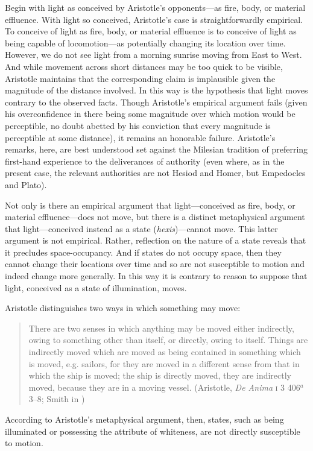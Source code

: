 Begin with light as conceived by Aristotle's opponents---as fire, body, or material effluence. With light so conceived, Aristotle's case is straightforwardly empirical. To conceive of light as fire, body, or material effluence is to conceive of light as being capable of locomotion---as potentially changing its location over time. However, we do not see light from a morning sunrise moving from East to West. And while movement across short distances may be too quick to be visible, Aristotle maintains that the corresponding claim is implausible given the magnitude of the distance involved. In this way is the hypothesis that light moves contrary to the observed facts. Though Aristotle's empirical argument fails (given his overconfidence in there being some magnitude over which motion would be perceptible, no doubt abetted by his conviction that every magnitude is perceptible at some distance), it remains an honorable failure. Aristotle's remarks, here, are best understood set against the Milesian tradition of preferring first-hand experience to the deliverances of authority (even where, as in the present case, the relevant authorities are not Hesiod and Homer, but Empedocles and Plato).

Not only is there an empirical argument that light---conceived as fire, body, or material effluence---does not move, but there is a distinct metaphysical argument that light---\-con\-ceived instead as a state (\emph{hexis})---cannot move. This latter argument is not empirical. Rather, reflection on the nature of a state reveals that it precludes space-occupancy. And if states do not occupy space, then they cannot change their locations over time and so are not susceptible to motion and indeed change more generally.  In this way it is contrary to reason to suppose that light, conceived as a state of illumination, moves. 

Aristotle distinguishes two ways in which something may move: 
\begin{quote}
	There are two senses in which anything may be moved either indirectly, owing to something other than itself, or directly, owing to itself. Things are indirectly moved which are moved as being contained in something which is moved, e.g. sailors, for they are moved in a different sense from that in which the ship is moved; the ship is directly moved, they are indirectly moved, because they are in a moving vessel. (Aristotle, \emph{De Anima} \textsc{i} 3 406\( ^{a} \)3--8; Smith in \citealt[9]{Barnes:1984uq})
\end{quote}
According to Aristotle's metaphysical argument, then, states, such as being illuminated or possessing the attribute of whiteness, are not directly susceptible to motion.

